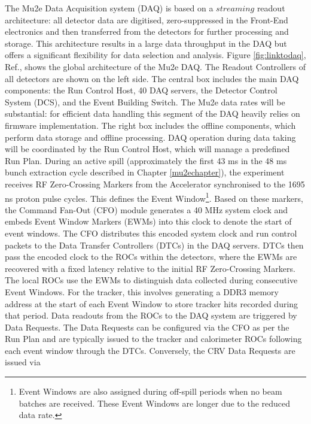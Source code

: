 The Mu2e Data Acquisition system (DAQ) is based on a $streaming$ readout architecture: 
all detector data are digitised, zero-suppressed in the 
Front-End electronics 
and then transferred from the detectors for further 
processing and storage. 
This architecture results in a large data throughput in 
the DAQ but offers a 
significant flexibility for data selection and analysis. 
Figure \ref{fig:linktodaq}, Ref.\cite{GIOIOSA2023167732}, 
shows the global 
architecture of the Mu2e DAQ. 
The Readout Controllers of all  detectors are shown 
on the left side. The central box includes the main DAQ 
components: the Run Control Host, 40 DAQ servers, the 
Detector Control System (DCS), and the Event Building 
Switch. The Mu2e data rates will be substantial: for 
efficient data handling this segment of the DAQ heavily 
relies on firmware implementation. The right box includes 
the offline components, which perform data storage and 
offline processing. DAQ operation during data taking will be coordinated by the Run Control Host, 
which will manage a predefined Run Plan. During an active spill (approximately the first 
43 ms in the 48 ms bunch extraction cycle described in Chapter \ref{mu2echapter}), 
the experiment receives RF Zero-Crossing Markers from the Accelerator 
synchronised to the 1695 ns proton pulse cycles. This defines the 
Event Window\footnote{Event Windows are also assigned during off-spill periods 
when no beam batches are received. 
These Event Windows are longer due to the reduced data rate.}. 
Based on these markers, the Command Fan-Out (CFO) module  generates a 40 MHz system clock and embeds Event 
Window Markers (EWMs) into this clock to denote the start of event 
windows. The CFO distributes this encoded system clock and run control 
packets to the Data Transfer Controllers (DTCs) in the DAQ servers. 
DTCs then pass the encoded clock to the ROCs within the detectors, 
where the EWMs are recovered with a fixed latency relative to the 
initial RF Zero-Crossing Markers. The local ROCs use the EWMs to distinguish 
data collected during consecutive Event Windows. For the tracker, 
this involves generating a DDR3 memory address at the start of each 
Event Window to store tracker hits recorded during that period. 
Data readouts from the ROCs to the DAQ system are triggered by Data Requests. 
The Data Requests can be configured via the CFO as per the Run Plan and are 
typically issued to the tracker and calorimeter ROCs following each event 
window through the DTCs. Conversely, the CRV Data Requests are issued via 
